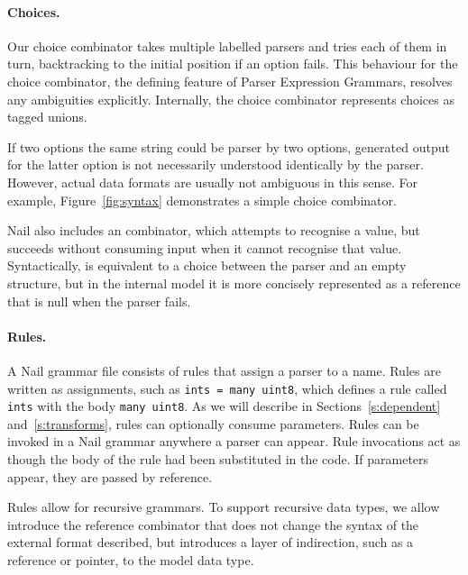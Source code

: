 \paragraph{Choices.}
Our choice combinator takes multiple labelled parsers and tries each of them in turn, backtracking
to the initial position if an option fails. This behaviour for the choice combinator, the defining
feature of Parser Expression Grammars\cite{ford2002packrat}, resolves any ambiguities explicitly.
Internally, the choice combinator represents choices as tagged unions. 

If two options the same string could be parser by two options, generated output for the latter
option is not necessarily understood identically by the parser. However, actual data formats are
usually not ambiguous in this sense.
For example, Figure~\ref{fig:syntax} demonstrates a simple choice
combinator.


Nail also includes an  combinator, which attempts to recognise a value, but succeeds
without consuming input when it cannot recognise that value. Syntactically,  is
equivalent to a choice between the parser and an empty structure, but in the internal model it is
more concisely represented as a reference that is null when the parser fails.

\paragraph{Rules.}
A Nail grammar file consists of rules that assign a parser to a name. Rules are written as
assignments, such as \texttt{ints = many uint8}, which defines a rule called \texttt{ints} with the
body \texttt{many uint8}.  As we will describe in Sections~\ref{s:dependent}
and~\ref{s:transforms}, rules can optionally consume parameters. 
Rules can be invoked in a Nail grammar anywhere a parser can appear. Rule invocations act as though
the body of the rule had been substituted in the code. If parameters appear, they are passed by reference.

Rules allow for recursive grammars. To support recursive data types, we allow introduce the
reference combinator \cc{*}  that does not change the syntax of the external format described, but
introduces a layer of indirection, such as a reference or pointer, to the model data type.




